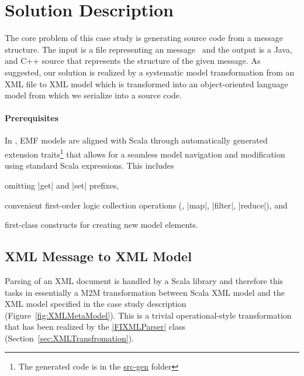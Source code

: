 
\section{Solution Description}
\label{sec:SolutionDescription}

\enlargethispage{20mm}

The core problem of this case study is generating source code from a \FIXML message structure.
The input is a file representing an  message~\cite{FIXML2004} and the output is a Java, \Csharp and C++ source that represents the structure of the given \FIXML message. 
As suggested, our solution is realized by a systematic model transformation from an XML file to XML model which is transformed into an object-oriented language model from which we serialize into a source code.

\vspace*{-5mm}
\paragraph{Prerequisites}
%
In \SIGMA, EMF models are aligned with Scala through automatically generated extension traits\footnote{The generated code is in the \href{https://github.com/fikovnik/ttc14-fixml-sigma/blob/master/ttc14-fixml-base/src-gen}{src-gen} folder} that allows for a seamless model navigation and modification using standard Scala expressions.
This includes
%
\begin{inparaitem}[]
  \item omitting \Scala|get| and \Scala|set| prefixes,
  \item convenient first-order logic collection operations (\Eg, \Scala|map|, \Scala|filter|, \Scala|reduce|), and
  \item first-class constructs for creating new model elements.
\end{inparaitem}

\subsection{\FIXML XML Message to XML Model}

Parsing of an XML document is handled by a Scala library and therefore this tasks in essentially a M2M transformation between Scala XML model and the XML model specified in the case study description (\Cf Figure~\ref{fig:XMLMetaModel}).
This is a trivial operational-style transformation that has been realized by the \href{https://github.com/fikovnik/ttc14-fixml-sigma/blob/master/ttc14-fixml-base/src/fr/inria/spirals/sigma/ttc14/fixml/FIXMLParser.scala}{\Scala|FIXMLParser|} class (\Cf Section~\ref{sec:XMLTransfromation}).

